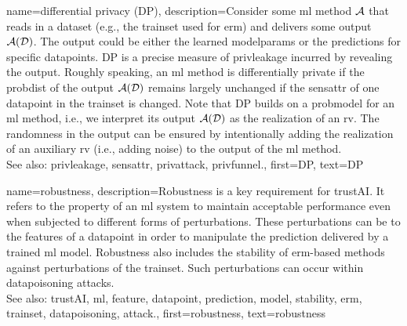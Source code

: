 {name={differential privacy (DP)},
  description={Consider some \gls{ml} method $\mathcal{A}$ 
  	that reads in a \gls{dataset} (e.g., the \gls{trainset} 
  	used for \gls{erm}) and delivers some output $\mathcal{A}(\mathcal{D})$. The output 
  	could be either the learned \gls{modelparams} or the \glspl{prediction} for specific \glspl{datapoint}. 
  	DP is a precise measure of \gls{privleakage} incurred by revealing the 
  	output. Roughly speaking, an \gls{ml} method is differentially private if the \gls{probdist} 
  	of the output $\mathcal{A}(\mathcal{D})$ remains largely unchanged if the \gls{sensattr} 
  	of one \gls{datapoint} in the \gls{trainset} is changed. Note that DP 
  	builds on a \gls{probmodel} for an \gls{ml} method, i.e., we interpret its output $\mathcal{A}(\mathcal{D})$ 
  	as the \gls{realization} of an \gls{rv}. The randomness in the output can be ensured 
  	by intentionally adding the \gls{realization} of an auxiliary \gls{rv} (i.e., adding noise) to 
  	the output of the \gls{ml} method.
				\\ 
	See also: \gls{privleakage}, \gls{sensattr}, \gls{privattack}, \gls{privfunnel}.}, 
  first={DP}, 
  text={DP} 
}

{name={robustness},
	description={Robustness is a key requirement for \gls{trustAI}. It
		refers to the property of an \gls{ml} system to maintain acceptable performance even when 
		subjected to different forms of perturbations. These perturbations can be to the \glspl{feature} 
		of a \gls{datapoint} in order to manipulate the \gls{prediction} delivered by a trained \gls{ml} \gls{model}. 
		Robustness also includes the \gls{stability} of \gls{erm}-based methods against perturbations 
		of the \gls{trainset}. Such perturbations can occur within \gls{datapoisoning} \glspl{attack}. 
		\\ 
		See also: \gls{trustAI}, \gls{ml}, \gls{feature}, \gls{datapoint}, \gls{prediction}, \gls{model}, \gls{stability}, \gls{erm}, \gls{trainset}, \gls{datapoisoning}, \gls{attack}.}, 
	first={robustness}, 
	text={robustness} 
}



